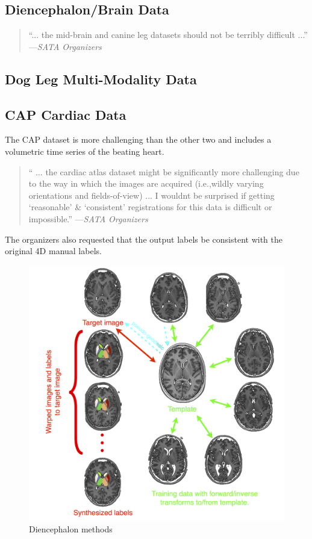 \documentclass{llncs}
\begin{document}
\subsection{Diencephalon/Brain Data}
 \begin{quote}
 ``... the mid-brain and canine leg
  datasets should not be terribly difficult ...'' ---{\em SATA Organizers}
\end{quote}
 
\subsection{Dog Leg Multi-Modality Data}

\subsection{CAP Cardiac Data}
The CAP dataset is more challenging than the other two and includes a volumetric time series of the beating heart. 

 \begin{quote}
  `` ... the cardiac atlas dataset
  might be significantly more challenging due to the way in which the
  images are acquired (i.e.,wildly varying orientations and
  fields-of-view) ... I wouldnt be surprised if getting `reasonable' \& `consistent' registrations for this data is difficult or impossible.'' ---{\em SATA Organizers}
\end{quote}
 
\noindent The organizers also requested that the output labels be
consistent with the original 4D manual labels.  

\begin{figure}[t]
 \centering 
  \includegraphics[width=5in]{../figs/SATA_diencephalon.png}
 \caption{Diencephalon methods}
 \label{fig:DIEmethods}
\end{figure}
\end{document}
